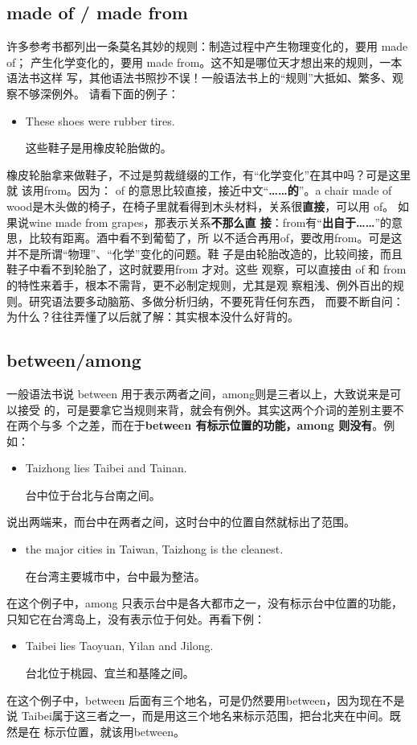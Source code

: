 \subsection{made of / made from}
许多参考书都列出一条莫名其妙的规则：制造过程中产生物理变化的，要用 made of；
产生化学变化的，要用 made from。这不知是哪位天才想出来的规则，一本语法书这样
写，其他语法书照抄不误！一般语法书上的“规则”大抵如、繁多、观察不够深例外。
请看下面的例子：
\begin{itemize}
\item  These shoes were  rubber tires.

  这些鞋子是用橡皮轮胎做的。
\end{itemize}
橡皮轮胎拿来做鞋子，不过是剪裁缝缀的工作，有“化学变化”在其中吗？可是这里就
该用from。因为： of 的意思比较直接，接近中文“\textbf{……的}”。a chair made of
wood是木头做的椅子，在椅子里就看得到木头材料，关系很\textbf{直接}，可以用 of。
如果说wine made from grapes，那表示关系\textbf{不那么直
  接}：from有“\textbf{出自于……}”的意思，比较有距离。酒中看不到葡萄了，所
以不适合再用of，要改用from。可是这并不是所谓“物理”、“化学”变化的问题。鞋
子是由轮胎改造的，比较间接，而且鞋子中看不到轮胎了，这时就要用from 才对。这些
观察，可以直接由 of 和 from的特性来着手，根本不需背，更不必制定规则，尤其是观
察粗浅、例外百出的规则。研究语法要多动脑筋、多做分析归纳，不要死背任何东西，
而要不断自问：为什么？往往弄懂了以后就了解：其实根本没什么好背的。

\subsection{between/among}

一般语法书说 between 用于表示两者之间，among则是三者以上，大致说来是可以接受
的，可是要拿它当规则来背，就会有例外。其实这两个介词的差别主要不在两个与多
个之差，而在于\textbf{between 有标示位置的功能，among 则没有}。例如：

\begin{itemize}
\item Taizhong lies  Taibei and Tainan.

  台中位于台北与台南之间。
\end{itemize}
说出两端来，而台中在两者之间，这时台中的位置自然就标出了范围。

\begin{itemize}
\item {} the major cities in Taiwan, Taizhong is the cleanest.

  在台湾主要城市中，台中最为整洁。
\end{itemize}
在这个例子中，among 只表示台中是各大都市之一，没有标示台中位置的功能，只知它在台湾岛上，没有表示位于何处。再看下例：
\begin{itemize}
\item  Taibei lies  Taoyuan, Yilan and Jilong.

  台北位于桃园、宜兰和基隆之间。
\end{itemize}
在这个例子中，between 后面有三个地名，可是仍然要用between，因为现在不是
说 Taibei属于这三者之一，而是用这三个地名来标示范围，把台北夹在中间。既然是在
标示位置，就该用between。


